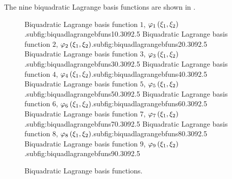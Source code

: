 The nine \twodal biquadratic Lagrange basis functions are shown in .


\begin{figure}[hbtp]
   \centering
     {Biquadratic Lagrange basis function $1$, $   \varphi_{1} \left( \xi_{1},\xi_{2} \right)  $.}{subfig:biquadlagrangebfuns1}{0.30\linewidth}{9}{2.5}{}
   \hfil
     {Biquadratic Lagrange basis function $2$, $   \varphi_{2} \left( \xi_{1},\xi_{2} \right)  $.}{subfig:biquadlagrangebfuns2}{0.30\linewidth}{9}{2.5}{}
   \hfil
     {Biquadratic Lagrange basis function $3$, $   \varphi_{3} \left( \xi_{1},\xi_{2} \right)  $.}{subfig:biquadlagrangebfuns3}{0.30\linewidth}{9}{2.5}{}
     {Biquadratic Lagrange basis function $4$, $   \varphi_{4} \left( \xi_{1},\xi_{2} \right)  $.}{subfig:biquadlagrangebfuns4}{0.30\linewidth}{9}{2.5}{}
   \hfil
     {Biquadratic Lagrange basis function $5$, $   \varphi_{5} \left( \xi_{1},\xi_{2} \right)  $.}{subfig:biquadlagrangebfuns5}{0.30\linewidth}{9}{2.5}{}
   \hfil
     {Biquadratic Lagrange basis function $6$, $   \varphi_{6} \left( \xi_{1},\xi_{2} \right)  $.}{subfig:biquadlagrangebfuns6}{0.30\linewidth}{9}{2.5}{}
     {Biquadratic Lagrange basis function $7$, $   \varphi_{7} \left( \xi_{1},\xi_{2} \right)  $.}{subfig:biquadlagrangebfuns7}{0.30\linewidth}{9}{2.5}{}
   \hfil
     {Biquadratic Lagrange basis function $8$, $   \varphi_{8} \left( \xi_{1},\xi_{2} \right)  $.}{subfig:biquadlagrangebfuns8}{0.30\linewidth}{9}{2.5}{}
   \hfil
     {Biquadratic Lagrange basis function $9$, $   \varphi_{9} \left( \xi_{1},\xi_{2} \right)  $.}{subfig:biquadlagrangebfuns9}{0.30\linewidth}{9}{2.5}{}
   \caption[Biquadratic Lagrange basis functions.]{Biquadratic Lagrange basis functions.}
   \label{fig:biquadlagrangebfuns}
\end{figure}


